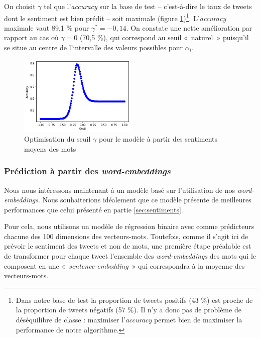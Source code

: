 \documentclass[11pt,french,french]{article}
\let\rmarkdownfootnote\footnote%
\def\footnote{\protect\rmarkdownfootnote}
\begin{document}
On choisit \(\gamma\) tel que l'\emph{accuracy} sur la base de test -- c'est-à-dire le taux de tweets dont le sentiment est bien prédit -- soit maximale (figure \ref{fig:max_baseline})\footnote{Dans notre base de test la proportion de tweets positifs (43 \%) est proche de la proportion de tweets négatifs (57 \%).
  Il n'y a donc pas de problème de déséquilibre de classe : maximiser l'\emph{accuracy} permet bien de maximiser la performance de notre algorithme.}. L'\emph{accuracy} maximale vaut 89,1 \% pour \(\gamma^* = -0,14\). On constate une nette amélioration par rapport au cas où \(\gamma = 0\) (70,5 \%), qui correspond au seuil «~naturel~» puisqu'il se situe au centre de l'intervalle des valeurs possibles pour \(\alpha_i\).

\begin{figure}
\begin{center}
\includegraphics[width=0.5\textwidth]{img/max_baseline.png}
\captionsetup{margin=0cm,format=hang,justification=justified}
\caption{Optimisation du seuil $\gamma$ pour le modèle à partir des sentiments moyens des mots}\label{fig:max_baseline}
\end{center}
\end{figure}

\hypertarget{sec:wordembeddings}{%
\subsubsection{\texorpdfstring{Prédiction à partir des \emph{word-embeddings}}{Prédiction à partir des word-embeddings}}\label{sec:wordembeddings}}

Nous nous intéressons maintenant à un modèle basé sur l'utilisation de nos \emph{word-embeddings}.
Nous souhaiterions idéalement que ce modèle présente de meilleures performances que celui présenté en partie \ref{sec:sentiments}.

Pour cela, nous utilisons un modèle de régression binaire avec comme prédicteurs chacune des 100 dimensions des vecteurs-mots.
Toutefois, comme il s'agit ici de prévoir le sentiment des tweets et non de mots, une première étape préalable est de transformer pour chaque tweet l'ensemble des \emph{word-embeddings} des mots qui le composent en une «~\emph{sentence-embedding}~» qui correspondra à la moyenne des vecteurs-mots.
\end{document}
